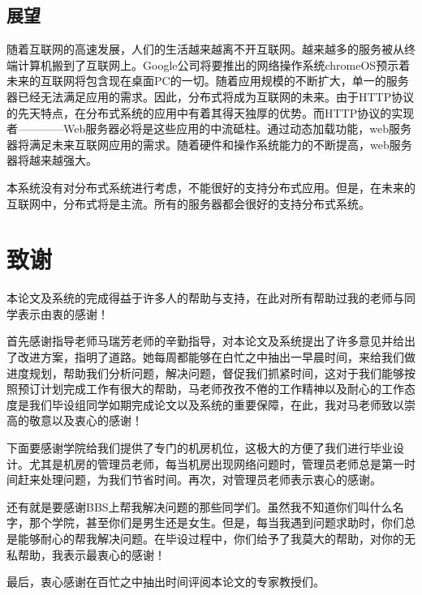 \documentclass[12pt, twoside, a4paper, xetex]{report}
\begin{document}
\section{展望}
	随着互联网的高速发展，人们的生活越来越离不开互联网。越来越多的服务被从终端计算机搬到了互联网上。Google公司将要推出的网络操作系统chromeOS预示着未来的互联网将包含现在桌面PC的一切。随着应用规模的不断扩大，单一的服务器已经无法满足应用的需求。因此，分布式将成为互联网的未来。由于HTTP协议的先天特点，在分布式系统的应用中有着其得天独厚的优势。而HTTP协议的实现者————Web服务器必将是这些应用的中流砥柱。通过动态加载功能，web服务器将满足未来互联网应用的需求。随着硬件和操作系统能力的不断提高，web服务器将越来越强大。
	
	本系统没有对分布式系统进行考虑，不能很好的支持分布式应用。但是，在未来的互联网中，分布式将是主流。所有的服务器都会很好的支持分布式系统。

\titleformat{\chapter}{\center \three \bf}{}{1em}{}

\chapter{致谢}

本论文及系统的完成得益于许多人的帮助与支持，在此对所有帮助过我的老师与同学表示由衷的感谢！

首先感谢指导老师马瑞芳老师的辛勤指导，对本论文及系统提出了许多意见并给出了改进方案，指明了道路。她每周都能够在白忙之中抽出一早晨时间，来给我们做进度规划，帮助我们分析问题，解决问题，督促我们抓紧时间，这对于我们能够按照预订计划完成工作有很大的帮助，马老师孜孜不倦的工作精神以及耐心的工作态度是我们毕设组同学如期完成论文以及系统的重要保障，在此，我对马老师致以崇高的敬意以及衷心的感谢！

下面要感谢学院给我们提供了专门的机房机位，这极大的方便了我们进行毕业设计。尤其是机房的管理员老师，每当机房出现网络问题时，管理员老师总是第一时间赶来处理问题，为我们节省时间。再次，对管理员老师表示衷心的感谢。

还有就是要感谢BBS上帮我解决问题的那些同学们。虽然我不知道你们叫什么名字，那个学院，甚至你们是男生还是女生。但是，每当我遇到问题求助时，你们总是能够耐心的帮我解决问题。在毕设过程中，你们给予了我莫大的帮助，对你的无私帮助，我表示最衷心的感谢！

最后，衷心感谢在百忙之中抽出时间评阅本论文的专家教授们。
\end{document}
